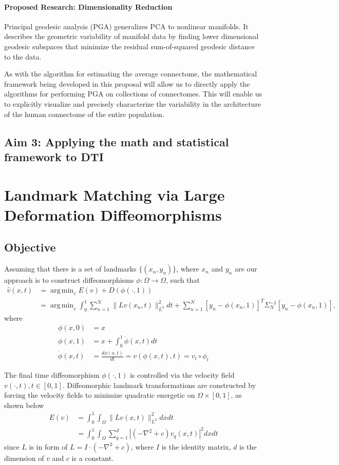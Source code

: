 \documentclass{article}
\DeclareMathOperator*{\argmin}{arg\,min}
\theoremstyle{definition}
\theoremstyle{plain}
\begin{document}
\paragraph{Proposed Research: Dimensionality Reduction}Principal geodesic analysis (PGA)\cite{pga1,pga2} generalizes PCA to nonlinear manifolds. It describes the geometric variability of manifold data by finding lower dimensional geodesic subspaces that minimize the residual sum-of-squared geodesic distance to the data.

As with the algorithm for estimating the average connectome, the mathematical framework being developed in this proposal will allow us to directly apply the algorithms for performing PGA on collections of connectomes. This will enable us to explicitly visualize and precisely characterize the variability in the architecture of the human connectome of the entire population.

\subsection{Aim 3: Applying the math and statistical framework to DTI}


\newpage
\section{Landmark Matching via Large Deformation Diffeomorphisms\cite{joshi,miller,johnson}}
\subsection{Objective}
Assuming that there is a set of landmarks $\{(x_n,y_n)\}$, where $x_n$ and $y_n$ are  our approach is to construct diffeomorphisms $\phi:\Omega\rightarrow\Omega$, such that
\begin{align}
    \hat{v}(x,t)&=\argmin_vE(v)+D(\phi(\cdot,1))\\ \nonumber
    &=\argmin_v \int^1_0\sum_{n=1}^N\|Lv(x_n,t)\|^2_{L^2}dt+\sum^N_{n=1}[y_n-\phi(x_n,1)]^T\Sigma^{-1}_N[y_n-\phi(x_n,1)],
\end{align}
where
\begin{align*}
    \phi(x,0)&=x\\
    \phi(x,1)&=x+\int^1_0\Dot{\phi}(x,t)dt\\
    \Dot{\phi}(x,t)&=\frac{d\phi(x,t)}{dt}=v(\phi(x,t),t)=v_t\circ\phi_t
\end{align*}

The final time diffeomorphism $\phi(\cdot,1)$ is controlled via the velocity field $v(\cdot,t),t\in[0,1]$. Diffeomorphic landmark transformations are constructed by forcing the velocity fields to minimize quadratic energetic on $\Omega\times[0,1]$, as shown below
\begin{align*}
    E(v)&=\int_0^1\int_\Omega\|Lv(x,t)\|^2_{L^2}dxdt\\
    &=\int_0^1\int_\Omega\sum^{d}_{q=1}|(-\nabla^2+c)v_q(x,t)|^2dxdt
\end{align*} 
since $L$ is in form of $L=I\cdot(-\nabla^2+c)$, where $I$ is the identity matrix, $d$ is the dimension of $v$ and $c$ is a constant.
\end{document}
